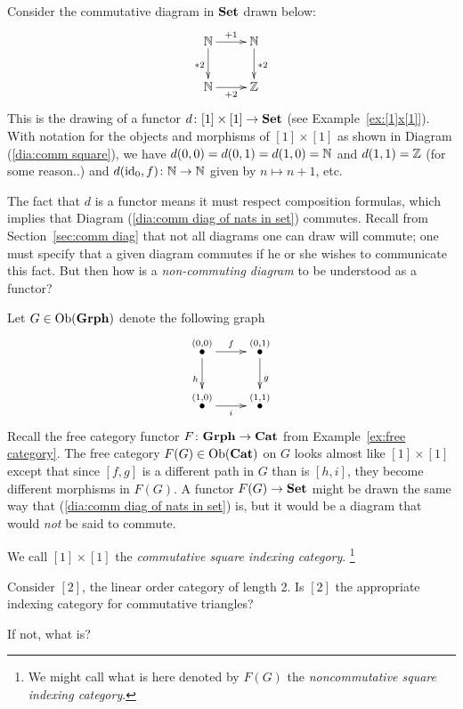 \documentclass[CT4S-EN-RU]{subfiles}
\begin{document}
\begin{exampleENG}\label{ex:comm vs noncomm diags}
Consider the commutative diagram in ${\mathbf{Set}}$ drawn below:
\begin{align}\label{dia:comm diag of nats in set}
\xymatrix{\NN\ar[r]^{+1}\ar[d]_{*2}&\NN\ar[d]^{*2}\\\NN\ar[r]_{+2}&\ZZ}
\end{align}
This is the drawing of a functor $d\colon[1]\times[1]\rightarrow{\mathbf{Set}}$ (see Example~\ref{ex:[1]x[1]}). With notation for the objects and morphisms of $[1]\times[1]$ as shown in Diagram (\ref{dia:comm square}), we have $d(0,0)=d(0,1)=d(1,0)={\mathbb N}$ and $d(1,1)={\mathbb Z}$ (for some reason..) and $d(\textnormal{id}_0,f)\colon{\mathbb N}\rightarrow{\mathbb N}$ given by $n\mapsto n+1$, etc. 

The fact that $d$ is a functor means it must respect composition formulas, which implies that Diagram (\ref{dia:comm diag of nats in set}) commutes. Recall from Section~\ref{sec:comm diag} that not all diagrams one can draw will commute; one must specify that a given diagram commutes if he or she wishes to communicate this fact. But then how is a {\em non-commuting diagram} to be understood as a functor?

Let $G\in\textnormal{Ob}({\mathbf{Grph}})$ denote the following graph 
$$\xymatrix{\LMO{(0,0)}\ar[r]^f\ar[d]_h&\LMO{(0,1)}\ar[d]^{g}\\\LMO{(1,0)}\ar[r]_{i}&\LMO{(1,1)}}$$
Recall the free category functor $F\colon{\mathbf{Grph}}\rightarrow{\mathbf{Cat}}$ from Example~\ref{ex:free category}. The free category $F(G)\in\textnormal{Ob}({\mathbf{Cat}})$ on $G$ looks almost like $[1]\times[1]$ except that since $[f,g]$ is a different path in $G$ than is $[h,i]$, they become different morphisms in $F(G)$. A functor $F(G)\rightarrow{\mathbf{Set}}$ might be drawn the same way that (\ref{dia:comm diag of nats in set}) is, but it would be a diagram that would {\em not} be said to commute.

We call $[1]\times [1]$ the {\em commutative square indexing category}. 
\footnote{We might call what is here denoted by $F(G)$ the {\em noncommutative square indexing category}.}
\end{exampleENG}

\begin{exampleRUS}\label{ex:comm vs noncomm diags}
\end{exampleRUS}

\begin{exerciseENG}
Consider $[2]$, the linear order category of length 2.
\sexc Is $[2]$ the appropriate indexing category for commutative triangles?
\item If not, what is?
\endsexc
\end{exerciseENG}
\end{document}
